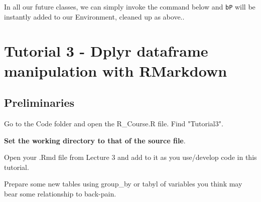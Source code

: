 \documentclass[titlepage]{book}\usepackage{knitr}
\begin{document}
In all our future classes, we can simply invoke the command below and \texttt{bP} will be instantly added to our Environment, cleaned up as above..

\begin{knitrout}
\color{fgcolor}\begin{kframe}
\begin{alltt}
\hlstd{(}\hlstd{)}
\end{alltt}
\end{kframe}
\end{knitrout}








\chapter{Tutorial 3 - Dplyr dataframe manipulation with RMarkdown}\label{T3}

\author{Brian Williams $<$\href{mailto:bjw649@gmail.com}%
{bjw649@gmail.com}$>$}

\section{Preliminaries}

Go to the Code folder and open the R\_Course.R file.  Find "Tutorial3".

\textbf{Set the working directory to that of the source file}.

\begin{knitrout}
\color{fgcolor}\begin{kframe}
\begin{alltt}
\hlstd{(}\hlstd{)}
\end{alltt}
\end{kframe}
\end{knitrout}

Open your .Rmd file from Lecture 3 and add to it as you use/develop code in this tutorial.

Prepare some new tables using group\_by or tabyl of variables you think may bear some relationship to back-pain. 
\end{document}
